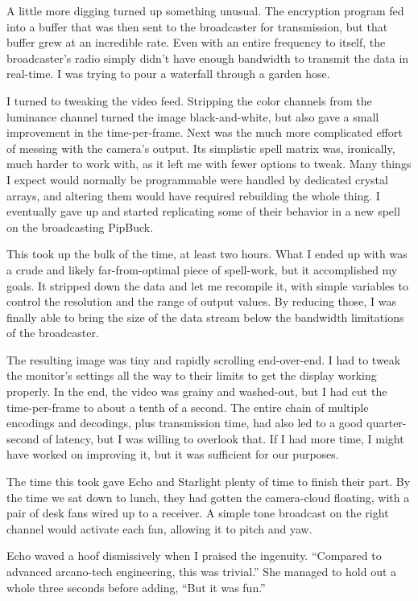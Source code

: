 A little more digging turned up something unusual. The encryption program fed into a buffer that was then sent to the broadcaster for transmission, but that buffer grew at an incredible rate. Even with an entire frequency to itself, the broadcaster’s radio simply didn’t have enough bandwidth to transmit the data in real-time. I was trying to pour a waterfall through a garden hose.

I turned to tweaking the video feed. Stripping the color channels from the luminance channel turned the image black-and-white, but also gave a small improvement in the time-per-frame. Next was the much more complicated effort of messing with the camera’s output. Its simplistic spell matrix was, ironically, much harder to work with, as it left me with fewer options to tweak. Many things I expect would normally be programmable were handled by dedicated crystal arrays, and altering them would have required rebuilding the whole thing. I eventually gave up and started replicating some of their behavior in a new spell on the broadcasting PipBuck.

This took up the bulk of the time, at least two hours. What I ended up with was a crude and likely far-from-optimal piece of spell-work, but it accomplished my goals. It stripped down the data and let me recompile it, with simple variables to control the resolution and the range of output values. By reducing those, I was finally able to bring the size of the data stream below the bandwidth limitations of the broadcaster.

The resulting image was tiny and rapidly scrolling end-over-end. I had to tweak the monitor’s settings all the way to their limits to get the display working properly. In the end, the video was grainy and washed-out, but I had cut the time-per-frame to about a tenth of a second. The entire chain of multiple encodings and decodings, plus transmission time, had also led to a good quarter-second of latency, but I was willing to overlook that. If I had more time, I might have worked on improving it, but it was sufficient for our purposes.

The time this took gave Echo and Starlight plenty of time to finish their part. By the time we sat down to lunch, they had gotten the camera-cloud floating, with a pair of desk fans wired up to a receiver. A simple tone broadcast on the right channel would activate each fan, allowing it to pitch and yaw.

Echo waved a hoof dismissively when I praised the ingenuity. “Compared to advanced arcano-tech engineering, this was trivial.” She managed to hold out a whole three seconds before adding, “But it was fun.”

